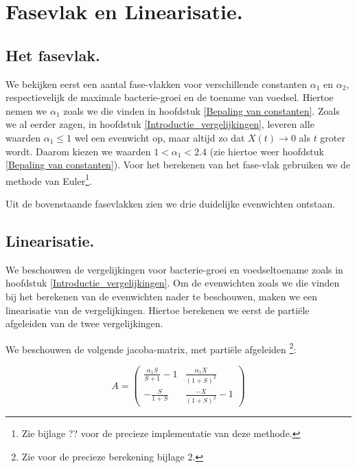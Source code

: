 
\chapter{Fasevlak en Linearisatie.}
\label{Fasevlak en Linearisatie}

\section{Het fasevlak.}

We bekijken eerst een aantal fase-vlakken voor verschillende constanten $\alpha_1$ en $\alpha_2$, respectievelijk de maximale bacterie-groei en de toename van voedsel. Hiertoe nemen we $\alpha_1$ zoals we die vinden in hoofdstuk \ref{Bepaling van constanten}. Zoals we al eerder zagen, in hoofdstuk \ref{Introductie_vergelijkingen}, leveren alle waarden $ \alpha_1 \leq 1$ wel een evenwicht op, maar altijd zo dat $X(t) \to 0$ als $t$ groter wordt. Daarom kiezen we waarden $1 < \alpha_1  < 2.4$ (zie hiertoe weer hoofdstuk \ref{Bepaling van constanten}). Voor het berekenen van het fase-vlak gebruiken we de methode van Euler\footnote{Zie bijlage ?? voor de precieze implementatie van deze methode.}.




Uit de bovenstaande fasevlakken zien we drie duidelijke evenwichten ontstaan. 


\section{Linearisatie.}

We beschouwen de vergelijkingen voor bacterie-groei en voedseltoename zoals in hoofdstuk \ref{Introductie_vergelijkingen}. Om de evenwichten zoals we die vinden bij het berekenen van de evenwichten nader te beschouwen, maken we een linearisatie van de vergelijkingen. Hiertoe berekenen we eerst de parti\"ele afgeleiden van de twee vergelijkingen. 

We beschouwen de volgende jacoba-matrix, met parti\"ele afgeleiden \footnote{Zie voor de precieze berekening bijlage 2.}: %

\begin{equation*}
	A = 
	\begin{pmatrix}
		\frac{\alpha_1 S}{S + 1} - 1 & \frac{\alpha_1 X}{(1 + S)^2} \\
		-\frac{S}{1 + S} & \frac{-X}{(1 + S)^2} - 1
	\end{pmatrix}
\end{equation*}

